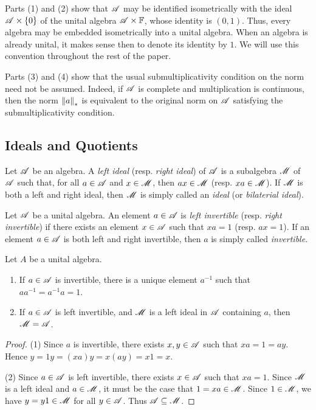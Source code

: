 \documentclass[reqno]{amsart}
\begin{document}
Parts (1) and (2) show that $\mathscr{A}$ may be identified isometrically with the ideal $\mathscr{A} \times \{0\}$ of the unital algebra $\mathscr{A} \times \mathbb{F}$, whose identity is $(0,1)$. Thus, every algebra may be embedded isometrically into a unital algebra. When an algebra is already unital, it makes sense then to denote its identity by $1$. We will use this convention throughout the rest of the paper.

	Parts (3) and (4) show that the usual submultiplicativity condition on the norm need not be assumed. Indeed, if $\mathscr{A}$ is complete and multiplication is continuous, then the norm $\left\lVert a \right\rVert_{\ast}$ is equivalent to the original norm on $\mathscr{A}$ satisfying the submultiplicativity condition.


\subsection{Ideals and Quotients}

\begin{definition}
	Let $\mathscr{A}$ be an algebra. A \emph{left ideal} (resp. \emph{right ideal}) of $\mathscr{A}$ is a subalgebra $\mathscr{M}$ of $\mathscr{A}$ such that, for all $a \in \mathscr{A}$ and $x \in \mathscr{M}$, then $ax \in \mathscr{M}$ (resp. $xa \in \mathscr{M}$). If $\mathscr{M}$ is both a left and right ideal, then $\mathscr{M}$ is simply called an \emph{ideal} (or \emph{bilaterial ideal}).
\end{definition}

\begin{definition}
	Let $\mathscr{A}$ be a unital algebra. An element $a \in \mathscr{A}$ is \emph{left invertible} (resp. \emph{right invertible}) if there exists an element $x \in \mathscr{A}$ such that $xa = 1$ (resp. $ax = 1$). If an element $a \in \mathscr{A}$ is both left and right invertible, then $a$ is simply called \emph{invertible}.
\end{definition}

\begin{proposition}\label{prop:ideals-and-inverts}
	Let $A$ be a unital algebra.
	\mbox{}
	\begin{enumerate}[label = (\arabic*),itemsep=1pt,topsep=3pt]
		\item If $a \in \mathscr{A}$ is invertible, there is a unique element $a^{-1}$ such that $a a^{-1} = a^{-1} a = 1$.
		\item If $a \in \mathscr{A}$ is left invertible, and $\mathscr{M}$ is a left ideal in $\mathscr{A}$ containing $a$, then $\mathscr{M} = \mathscr{A}$.
	\end{enumerate}
\end{proposition}
	\begin{proof}
		(1) Since $a$ is invertible, there exists $x,y \in \mathscr{A}$ such that $xa = 1 = ay$. Hence $y=1y=(xa)y = x(ay) = x1 = x$.

		(2) Since $a \in \mathscr{A}$ is left invertible, there exists $x \in \mathscr{A}$ such that $xa = 1$. Since $\mathscr{M}$ is a left ideal and $a \in \mathscr{M}$, it must be the case that $1 = xa \in \mathscr{M}$. Since $1 \in \mathscr{M}$, we have $y = y1 \in \mathscr{M}$ for all $y \in \mathscr{A}$. Thus $\mathscr{A} \subseteq \mathscr{M}$. 
	\end{proof}
\end{document}
